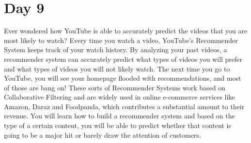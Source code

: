 \documentclass[11pt]{article}
\begin{document}
\section{Day 9}
Ever wondered how YouTube is able to accurately predict the videos that you are most likely to watch? Every time you watch a video, YouTube's Recommender System keeps track of your watch history. By analyzing your past videos, a recommender system can accurately predict what types of videos you will prefer and what types of videos you will not likely watch. The next time you go to YouTube, you will see your homepage flooded with recommendations, and most of those are bang on! These sorts of Recommender Systems work based on Collaborative Filtering and are widely used in online e-commerce services like Amazon, Daraz and Foodpanda, which contributes a substantial amount to their revenue. You will learn how to build a recommender system and based on the type of a certain content, you will be able to predict whether that content is going to be a major hit or barely draw the attention of customers.
\end{document}
